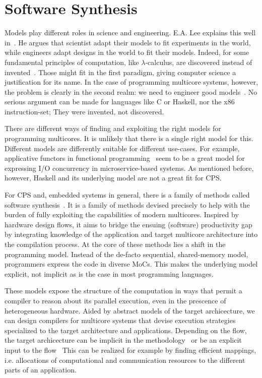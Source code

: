 \section{Software Synthesis}

Models play different roles in science and engineering.
E.A. Lee explains this well in~\cite{lee2017plato}.
He argues that scientist adapt their models to fit experiments in the world, while engineers adapt designs in the world to fit their models.
Indeed, for some fundamental principles of computation, like $\lambda$-calculus, are discovered instead of invented~\cite{wadler2015propositions}.
Those might fit in the first paradigm, giving computer science a justification for its name.
In the case of programming multicore systems, however, the problem is clearly in the second realm: we need to engineer good models~\cite{lee2006problem}.
No serious argument can be made for languages like C or Haskell, nor the x86 instruction-set; They were invented, not discovered.

There are different ways of finding and exploiting the right models for programming multicores.
It is unlikely that there is a single right model for this.
Different models are differently suitable for different use-cases. 
For example, applicative functors in functional programming~\cite{marlow2014haxl} seem to be a great model for expressing \acs{I/O} concurrency in microservice-based systems.
As mentioned before, however, Haskell and its underlying model are not a great fit for \ac{CPS}.

For \ac{CPS} and, embedded systems in general, there is a family of methods called software synthesis~\cite{ritz1992softwaresynthesis,abbott1993softwaresynthesis,lin1998softwaresynthesis,bhartacharyya2000softwaresynthesis,pino1995softwaresynthesis,bhattacharyya2012softwaresynthesis}.
It is a family of methods devised precisely to help with the burden of fully exploiting the capabilities of modern multicores.
Inspired by hardware design flows, it aims to bridge the ensuing (software) productivity gap by integrating knowledge of the application and target multicore architecture into the compilation process.
At the core of these methods lies a shift in the programming model.
Instead of the de-facto sequential, shared-memory model, programmers express the code in diverse \acp{MoC}.
This makes the underlying model explicit, not implicit as is the case in most programming languages.

These models expose the structure of the computation in ways that permit a compiler to reason about its parallel execution, even in the prescence of heterogeneous hardware.
Aided by abstract models of the target archicecture, we can design compilers for multicore systems that devise execution strategies specialized to the target architecture and applications.
Depending on the flow, the target archicecture can be implicit in the methodology~\cite{ritz1992softwaresynthesis} or be an explicit input to the flow~\cite{maps}
This can be realized for example by finding efficient mappings, i.e. allocations of computational and communication resources to the different parts of an application.

